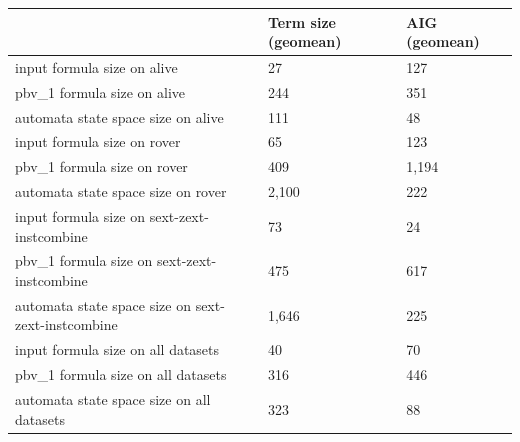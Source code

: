 \begin{tabular}{lll}
\toprule
                                                    & Term size (geomean)   & AIG (geomean)   \\
\midrule
 input formula size on alive                        & 27                    & 127             \\
 pbv\_1 formula size on alive                        & 244                   & 351             \\
 automata state space size on alive                 & 111                   & 48              \\
 input formula size on rover                        & 65                    & 123             \\
 pbv\_1 formula size on rover                        & 409                   & 1,194           \\
 automata state space size on rover                 & 2,100                 & 222             \\
 input formula size on sext-zext-instcombine        & 73                    & 24              \\
 pbv\_1 formula size on sext-zext-instcombine        & 475                   & 617             \\
 automata state space size on sext-zext-instcombine & 1,646                 & 225             \\
 input formula size on all datasets                 & 40                    & 70              \\
 pbv\_1 formula size on all datasets                 & 316                   & 446             \\
 automata state space size on all datasets          & 323                   & 88              \\
\bottomrule
\end{tabular}
